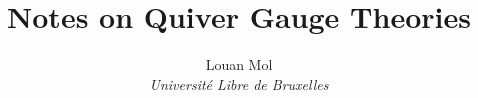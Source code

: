 \documentclass[a4paper,10pt]{article}
\title{\textbf{Notes on Quiver Gauge Theories}}
\author{Louan Mol\\ \textit{Université Libre de Bruxelles}}
\date{}
\begin{document}

  
\pagebreak

\tableofcontents

\pagebreak

\nocite{*}









\pagebreak
\appendix



\pagebreak

\listoftodos

\pagebreak

\printbibliography
\end{document}
